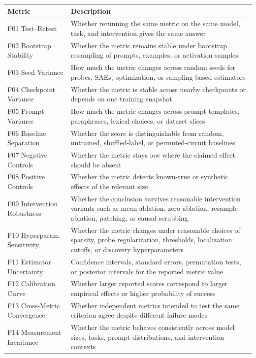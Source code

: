 \documentclass[10pt]{article}
\begin{document}
\begin{minipage}{\linewidth}
\par
\begin{center}
\begin{tabular}{@{}lp{10cm}@{}}
\toprule
\textbf{Metric} & \textbf{Description} \\
\midrule
F01 Test--Retest & Whether rerunning the same metric on the same model, task, and intervention gives the same answer \\
\midrule
F02 Bootstrap Stability & Whether the metric remains stable under bootstrap resampling of prompts, examples, or activation samples \\
\midrule
F03 Seed Variance & How much the metric changes across random seeds for probes, SAEs, optimization, or sampling-based estimators \\
\midrule
F04 Checkpoint Variance & Whether the metric is stable across nearby checkpoints or depends on one training snapshot \\
\midrule
F05 Prompt Variance & How much the metric changes across prompt templates, paraphrases, lexical choices, or dataset slices \\
\midrule
F06 Baseline Separation & Whether the score is distinguishable from random, untrained, shuffled-label, or permuted-circuit baselines \\
\midrule
F07 Negative Controls & Whether the metric stays low where the claimed effect should be absent \\
\midrule
F08 Positive Controls & Whether the metric detects known-true or synthetic effects of the relevant size \\
\midrule
F09 Intervention Robustness & Whether the conclusion survives reasonable intervention variants such as mean ablation, zero ablation, resample ablation, patching, or causal scrubbing \\
\midrule
F10 Hyperparam. Sensitivity & Whether the metric changes under reasonable choices of sparsity, probe regularization, thresholds, localization cutoffs, or discovery hyperparameters \\
\midrule
F11 Estimator Uncertainty & Confidence intervals, standard errors, permutation tests, or posterior intervals for the reported metric value \\
\midrule
F12 Calibration Curve & Whether larger reported scores correspond to larger empirical effects or higher probability of success \\
\midrule
F13 Cross-Metric Convergence & Whether independent metrics intended to test the same criterion agree despite different failure modes \\
\midrule
F14 Measurement Invariance & Whether the metric behaves consistently across model sizes, tasks, prompt distributions, and intervention contexts \\
\bottomrule
\end{tabular}
\end{center}
\end{minipage}

\endgroup
\end{document}
